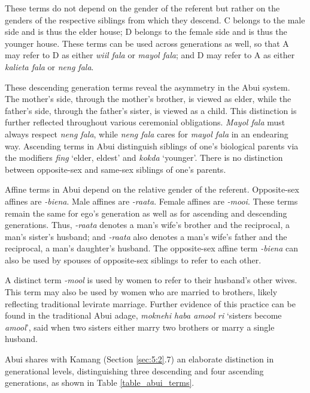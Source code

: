 These terms do not depend on the gender of the referent but rather on the genders of the respective siblings from which they descend. C belongs to the male side and is thus the elder house; D belongs to the female side and is thus the younger house. These terms can be used across generations as well, so that A may refer to D as either \textit{wiil fala} or \textit{mayol fala}; and D may refer to A as either \textit{kalieta fala} or \textit{neng fala}.

These descending generation terms reveal the asymmetry in the Abui system. The mother's side, through the mother's brother, is viewed as elder, while the father's side, through the father's sister, is viewed as a child. This distinction is further reflected throughout various ceremonial obligations. \textit{Mayol fala} must always respect \textit{neng fala}, while \textit{neng fala} cares for \textit{mayol fala} in an endearing way. Ascending terms in Abui distinguish siblings of one's biological parents via the modifiers \textit{fing} `elder, eldest' and \textit{kokda} `younger'. There is no distinction between opposite-sex and same-sex siblings of one's parents.

Affine terms in Abui depend on the relative gender of the referent. Opposite-sex affines are \textit{-biena}. Male affines are \textit{-raata}. Female affines are \textit{-mooi}. These terms remain the same for ego's generation as well as for ascending and descending generations. Thus, \textit{-raata} denotes a man's wife's brother and the reciprocal, a man's sister's husband; and \textit{-raata} also denotes a man's wife's father and the reciprocal, a man's daughter's husband. The opposite-sex affine term \textit{-biena} can also be used by spouses of opposite-sex siblings to refer to each other. 

A distinct term \textit{-mool} is used by women to refer to their husband's other wives. This term may also be used by women who are married to brothers, likely reflecting traditional levirate marriage. Further evidence of this practice can be found in the traditional Abui adage, \textit{moknehi haba amool ri} `sisters become \textit{amool}', said when two sisters either marry two brothers or marry a single husband. 

Abui shares with Kamang (Section \ref{sec:5:2}.7) an elaborate distinction in generational levels, distinguishing three descending and four ascending generations, as shown in Table \ref{table_abui_terms}.

